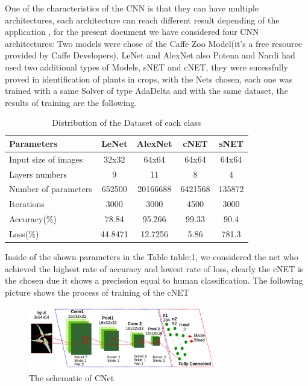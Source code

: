\documentclass[conference]{IEEEtran}
\begin{document}
One of the characteristics of the CNN is that they can have multiple architectures, each architecture can reach different result depending of the application , for the present document we have considered four CNN architectures: Two models were chose of the Caffe Zoo Model(it's a free resource provided by Caffe Developers), LeNet and AlexNet also Potena and Nardi had used two additional types of Models, sNET and cNET, they were sucessfully proved in identification of plants in crops\cite{Potena:Nardi}, with the Nets chosen, each one was trained with a same Solver of type AdaDelta and with the same dataset, the results of training are the following. \\
\begin{table}[h!]
\centering
\begin{tabular}{|l c c c c|} 
 \hline
 Parameters & LeNet & AlexNet & cNET & sNET \\ [0.5ex] 
 \hline
 Input size of images & 32x32 & 64x64 & 64x64 & 64x64 \\ 
 Layers numbers & 9 & 11 & 8 & 4\\
 Number of parameters & 652500 & 20166688 & 6421568 & 135872 \\ 
 Iterations & 3000 & 3000 & 4500 & 3000 \\ 
  Accuracy(\%) & 78.84 & 95.266 & 99.33 & 90.4 \\
  Loss(\%) & 44.8471 & 12.7256 & 5.86 & 781.3 \\ [1ex] 
 \hline
\end{tabular}  
\caption{Distribution of the Dataset of each class}
\label{table:1} 
\end{table}
Inside of the shown parameters in the Table {table:1}, we considered the net who achieved the highest rate of accuracy and lowest rate of loss, clearly the cNET is the chosen due it shows a precission equal to human classification. The following picture shows the process of training of the cNET \\



	\begin{figure}[h]
	\centering
	\includegraphics[width=3.2in]{arquitectura}
	\caption{ The schematic of CNet }
	\label{fig_sim}
	\end{figure}
\end{document}
